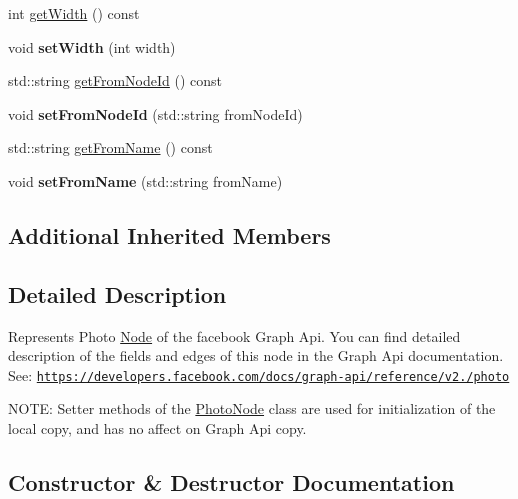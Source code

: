 \begin{DoxyCompactItemize}
\item 
int \hyperlink{classfl4cpp_1_1_photo_node_aad1d2bc7be9c530eff0df5c52481e97f}{get\+Width} () const 
\item 
void {\bfseries set\+Width} (int width)\hypertarget{classfl4cpp_1_1_photo_node_a2436e5c91893e0453103d73fca403492}{}\label{classfl4cpp_1_1_photo_node_a2436e5c91893e0453103d73fca403492}

\item 
std\+::string \hyperlink{classfl4cpp_1_1_photo_node_ad2b292b34cbe94286e749a6decb68359}{get\+From\+Node\+Id} () const 
\item 
void {\bfseries set\+From\+Node\+Id} (std\+::string from\+Node\+Id)\hypertarget{classfl4cpp_1_1_photo_node_a0dcb72ed60d759545aaffb9b866880d9}{}\label{classfl4cpp_1_1_photo_node_a0dcb72ed60d759545aaffb9b866880d9}

\item 
std\+::string \hyperlink{classfl4cpp_1_1_photo_node_a62c150a7ab44ca6bcd0b5233dcf90cbc}{get\+From\+Name} () const 
\item 
void {\bfseries set\+From\+Name} (std\+::string from\+Name)\hypertarget{classfl4cpp_1_1_photo_node_a08677c672ff474aef84da714713fa3aa}{}\label{classfl4cpp_1_1_photo_node_a08677c672ff474aef84da714713fa3aa}

\end{DoxyCompactItemize}
\subsection*{Additional Inherited Members}


\subsection{Detailed Description}
Represents Photo \hyperlink{classfl4cpp_1_1_node}{Node} of the facebook Graph Api. You can find detailed description of the fields and edges of this node in the Graph Api documentation. See\+: \href{https://developers.facebook.com/docs/graph-api/reference/v2.0/photo}{\tt https\+://developers.\+facebook.\+com/docs/graph-\/api/reference/v2./photo}

N\+O\+TE\+: Setter methods of the \hyperlink{classfl4cpp_1_1_photo_node}{Photo\+Node} class are used for initialization of the local copy, and has no affect on Graph Api copy. 

\subsection{Constructor \& Destructor Documentation}
